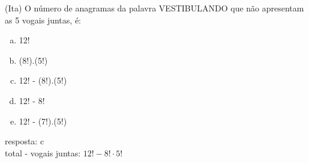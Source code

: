 \begin{ex}
 (Ita) O número de anagramas da palavra VESTIBULANDO que não apresentam as 5 vogais juntas, é:
    \begin{enumerate}[(a)]
    \item 12!
    \item (8!).(5!)
    \item 12! - (8!).(5!)
    \item 12! - 8!
    \item 12! - (7!).(5!)
    \end{enumerate}
      \begin{sol}
      resposta: c  \\
      total - vogais juntas: $12!-8!\cdot5!$
      \end{sol}
\end{ex}